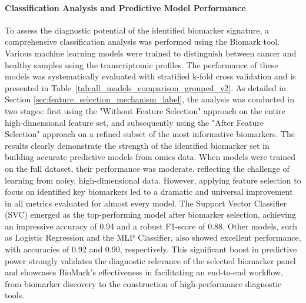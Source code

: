 \documentclass[journal]{IEEEtran}
\begin{document}
\paragraph{Classification Analysis and Predictive Model Performance}
To assess the diagnostic potential of the identified biomarker signature, a comprehensive classification analysis was performed using the Biomark tool. Various machine learning models were trained to distinguish between cancer and healthy samples using the transcriptomic profiles. The performance of these models was systematically evaluated with stratified k-fold cross validation and is presented in Table~\ref{tab:all_models_comparison_grouped_v2}. As detailed in Section \ref{sec:feature_selection_mechanism_label}, the analysis was conducted in two stages: first using the "Without Feature Selection" approach on the entire high-dimensional feature set, and subsequently using the "After Feature Selection" approach on a refined subset of the most informative biomarkers. The results clearly demonstrate the strength of the identified biomarker set in building accurate predictive models from omics data. When models were trained on the full dataset, their performance was moderate, reflecting the challenge of learning from noisy, high-dimensional data. However, applying feature selection to focus on identified key biomarkers led to a dramatic and universal improvement in all metrics evaluated for almost every model. The Support Vector Classifier (SVC) emerged as the top-performing model after biomarker selection, achieving an impressive accuracy of 0.94 and a robust F1-score of 0.88. Other models, such as Logistic Regression and the MLP Classifier, also showed excellent performance, with accuracies of 0.92 and 0.90, respectively. This significant boost in predictive power strongly validates the diagnostic relevance of the selected biomarker panel and showcases BioMark's effectiveness in facilitating an end-to-end workflow, from biomarker discovery to the construction of high-performance diagnostic tools.
\end{document}
